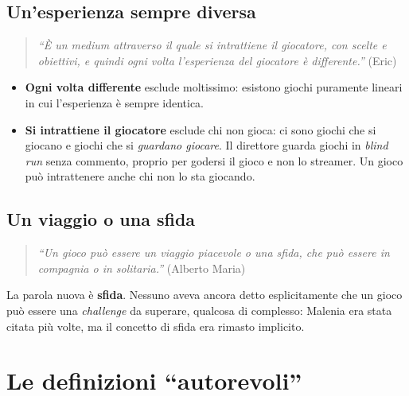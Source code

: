 \subsection{Un'esperienza sempre diversa}

\begin{quote}
\emph{``È un medium attraverso il quale si intrattiene il giocatore, con
scelte e obiettivi, e quindi ogni volta l'esperienza del giocatore è
differente.''} (Eric)
\end{quote}

\begin{itemize}
  \item \textbf{Ogni volta differente} esclude moltissimo: esistono giochi
        puramente lineari in cui l'esperienza è sempre identica.
  \item \textbf{Si intrattiene il giocatore} esclude chi non gioca: ci sono
        giochi che si giocano e giochi che si \emph{guardano giocare}. Il
        direttore guarda giochi in \emph{blind run} senza commento, proprio
        per godersi il gioco e non lo streamer. Un gioco può intrattenere
        anche chi non lo sta giocando.
\end{itemize}

\subsection{Un viaggio o una sfida}

\begin{quote}
\emph{``Un gioco può essere un viaggio piacevole o una sfida, che può essere
in compagnia o in solitaria.''} (Alberto Maria)
\end{quote}

La parola nuova è \textbf{sfida}. Nessuno aveva ancora detto esplicitamente che
un gioco può essere una \emph{challenge} da superare, qualcosa di complesso:
Malenia era stata citata più volte, ma il concetto di sfida era rimasto
implicito.

\section{Le definizioni ``autorevoli''}
\label{sec:definizioni-autorevoli}



